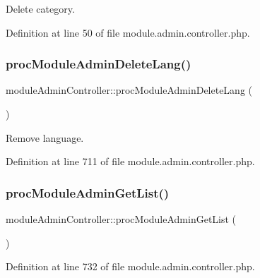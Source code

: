 Delete category. 



Definition at line 50 of file module.\+admin.\+controller.\+php.

\hypertarget{classmoduleAdminController_a4d0ac7d6d5266f01ede9961723d60f4f}{}\label{classmoduleAdminController_a4d0ac7d6d5266f01ede9961723d60f4f} 
\subsubsection{\texorpdfstring{proc\+Module\+Admin\+Delete\+Lang()}{procModuleAdminDeleteLang()}}
{\footnotesize\ttfamily module\+Admin\+Controller\+::proc\+Module\+Admin\+Delete\+Lang (\begin{DoxyParamCaption}{ }\end{DoxyParamCaption})}



Remove language. 



Definition at line 711 of file module.\+admin.\+controller.\+php.

\hypertarget{classmoduleAdminController_a34878c363345d5c055ec6f277bddc635}{}\label{classmoduleAdminController_a34878c363345d5c055ec6f277bddc635} 
\subsubsection{\texorpdfstring{proc\+Module\+Admin\+Get\+List()}{procModuleAdminGetList()}}
{\footnotesize\ttfamily module\+Admin\+Controller\+::proc\+Module\+Admin\+Get\+List (\begin{DoxyParamCaption}{ }\end{DoxyParamCaption})}



Definition at line 732 of file module.\+admin.\+controller.\+php.

\hypertarget{classmoduleAdminController_a63e53d2b8c360b3b2c03fd18d8f25d41}{}\label{classmoduleAdminController_a63e53d2b8c360b3b2c03fd18d8f25d41} 
